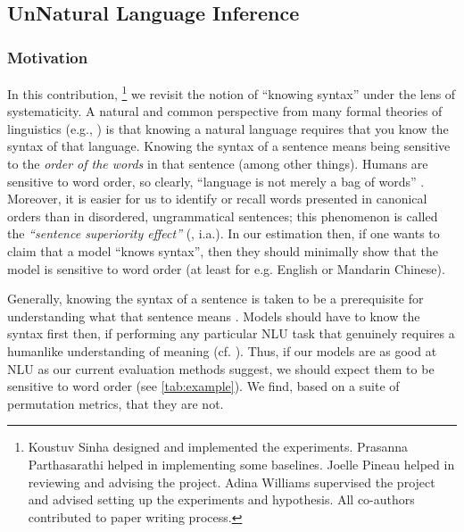 \documentclass[12pt]{article}
\begin{document}
\subsection{UnNatural Language Inference}

\subsubsection{Motivation}


In this contribution, \cite{sinha2021} \footnote{Koustuv Sinha designed and implemented the experiments. Prasanna Parthasarathi helped in implementing some baselines. Joelle Pineau helped in reviewing and advising the project. Adina Williams supervised the project and advised setting up the experiments and hypothesis. All co-authors contributed to paper writing process.} we revisit the notion of ``knowing syntax'' under the lens of systematicity. A natural and common perspective from many formal theories of linguistics (e.g., \cite{chomsky-1995-minimalist}) is that knowing a natural language requires that you know the syntax of that language. Knowing the syntax of a sentence means being sensitive to the \textit{order of the words} in that sentence (among other things).  Humans are sensitive to word order, so clearly, ``language is not merely a bag of words'' \cite[p.156]{harris-1954-distributional}.
Moreover, it is easier for us to identify or recall words presented in canonical orders than in disordered, ungrammatical sentences; this phenomenon is called the \textit{``sentence superiority effect''} (\cite{cattell-1886-time, scheerer1981early, toyota-2001-changes, baddeley-etal-2009-working, snell-grainger-2017-sentence, snell2019word, wen-etal-2019-parallel}, i.a.).
In our estimation then, if one wants to claim that  a model ``knows syntax'', then they should minimally show that the model is sensitive to word order (at least for e.g. English or Mandarin Chinese).

Generally, knowing the syntax of a sentence is taken to be a prerequisite for understanding what that sentence means \cite{heim-kratzer-1998-semantics}.
Models should have to know the syntax first then, if performing any particular NLU task that genuinely requires a humanlike understanding of meaning (cf. \cite{bender-koller-2020-climbing}).
Thus, if our models are as good at NLU as our current evaluation methods suggest, we should expect them to be sensitive to word order (see \autoref{tab:example}).  We find, based on a suite of permutation metrics, that they are not.
\end{document}
